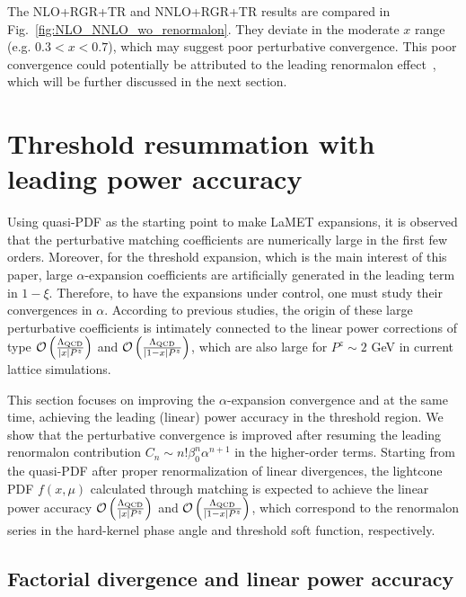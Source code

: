 \documentclass[a4paper,11pt]{article}
\begin{document}
The NLO+RGR+TR and NNLO+RGR+TR results are compared in Fig.~\ref{fig:NLO_NNLO_wo_renormalon}. They deviate in the moderate $x$ range (e.g. $0.3<x<0.7$), which may suggest poor perturbative convergence. This poor convergence could potentially be attributed to the leading renormalon effect~\cite{Zhang:2023bxs}, which will be further discussed in the next section. 


\section{Threshold resummation with leading power accuracy}\label{sec:renormalon}

Using quasi-PDF as the starting point to make LaMET expansions, it is observed that the perturbative matching coefficients are numerically large in the first few orders. Moreover, for the threshold expansion, which is the main interest of this paper, large $\alpha$-expansion coefficients are artificially generated in the leading term in $1-\xi$.  Therefore, to have the expansions under control, one must study their convergences in $\alpha$. According to previous studies, the origin of these large perturbative coefficients is intimately connected to the linear power corrections of type $\mathcal{O}\left(\frac{\Lambda_{\rm QCD}}{|x| P^z}\right)$ and $\mathcal{O}\left(\frac{\Lambda_{\rm QCD}}{|1-x| P^z}\right)$, which are also large for $P^z\sim 2$ GeV in current lattice simulations. 

This section focuses on improving the $\alpha$-expansion convergence and at the same time, achieving the leading (linear) power accuracy in the threshold region. 
We show that the perturbative convergence is improved after resuming the leading renormalon contribution $C_n\sim n!\beta_0^n \alpha^{n+1}$ in the higher-order terms. Starting from the quasi-PDF after proper renormalization of linear divergences, the lightcone PDF $f(x,\mu)$ calculated through matching is expected to achieve the linear power accuracy $\mathcal{O}\left(\frac{\Lambda_{\rm QCD}}{|x| P^z}\right)$ and $\mathcal{O}\left(\frac{\Lambda_{\rm QCD}}{|1-x| P^z}\right)$, which correspond to the renormalon series in the hard-kernel phase angle and threshold soft function, respectively. 

\subsection{Factorial divergence and linear power accuracy}
\end{document}
